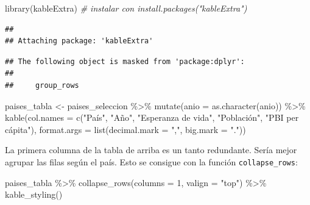 \documentclass[
  openany]{book}
\newenvironment{Shaded}{\begin{snugshade}}{\end{snugshade}}
\newcommand{\AttributeTok}[1]{\textcolor[rgb]{0.77,0.63,0.00}{#1}}
\newcommand{\CommentTok}[1]{\textcolor[rgb]{0.56,0.35,0.01}{\textit{#1}}}
\newcommand{\DecValTok}[1]{\textcolor[rgb]{0.00,0.00,0.81}{#1}}
\newcommand{\FunctionTok}[1]{\textcolor[rgb]{0.00,0.00,0.00}{#1}}
\newcommand{\NormalTok}[1]{#1}
\newcommand{\OtherTok}[1]{\textcolor[rgb]{0.56,0.35,0.01}{#1}}
\newcommand{\SpecialCharTok}[1]{\textcolor[rgb]{0.00,0.00,0.00}{#1}}
\newcommand{\StringTok}[1]{\textcolor[rgb]{0.31,0.60,0.02}{#1}}
\begin{document}
\begin{Shaded}
\begin{Highlighting}[]
\FunctionTok{library}\NormalTok{(kableExtra)  }\CommentTok{\# instalar con install.packages("kableExtra")}
\end{Highlighting}
\end{Shaded}

\begin{verbatim}
## 
## Attaching package: 'kableExtra'
\end{verbatim}

\begin{verbatim}
## The following object is masked from 'package:dplyr':
## 
##     group_rows
\end{verbatim}

\begin{Shaded}
\begin{Highlighting}[]
\NormalTok{paises\_tabla }\OtherTok{\textless{}{-}}\NormalTok{ paises\_seleccion }\SpecialCharTok{\%\textgreater{}\%} 
  \FunctionTok{mutate}\NormalTok{(}\AttributeTok{anio =} \FunctionTok{as.character}\NormalTok{(anio)) }\SpecialCharTok{\%\textgreater{}\%} 
  \FunctionTok{kable}\NormalTok{(}\AttributeTok{col.names =} \FunctionTok{c}\NormalTok{(}\StringTok{"País"}\NormalTok{, }\StringTok{"Año"}\NormalTok{, }\StringTok{"Esperanza de vida"}\NormalTok{, }\StringTok{"Población"}\NormalTok{, }\StringTok{"PBI per cápita"}\NormalTok{),}
        \AttributeTok{format.args =} \FunctionTok{list}\NormalTok{(}\AttributeTok{decimal.mark =} \StringTok{","}\NormalTok{, }\AttributeTok{big.mark =} \StringTok{"."}\NormalTok{))}
\end{Highlighting}
\end{Shaded}

La primera columna de la tabla de arriba es un tanto redundante.
Sería mejor agrupar las filas según el país.
Esto se consigue con la función \texttt{collapse\_rows}:

\begin{Shaded}
\begin{Highlighting}[]
\NormalTok{paises\_tabla }\SpecialCharTok{\%\textgreater{}\%} 
  \FunctionTok{collapse\_rows}\NormalTok{(}\AttributeTok{columns =} \DecValTok{1}\NormalTok{, }\AttributeTok{valign =} \StringTok{"top"}\NormalTok{)  }\SpecialCharTok{\%\textgreater{}\%} 
  \FunctionTok{kable\_styling}\NormalTok{() }
\end{Highlighting}
\end{Shaded}
\end{document}

